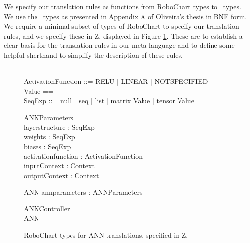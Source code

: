 

We specify our translation rules as functions from RoboChart types to \Circus \ types. We use the \Circus \ types as presented in Appendix A of Oliveira's thesis \cite{Oli06} in BNF form. We require a minimal subset of types of RoboChart to specify our translation rules, and we specify these in Z, displayed in Figure \ref{fig:robochart-ann-types}. These are to establish a clear basis for the translation rules in our meta-language and to define some helpful shorthand to simplify the description of these rules. 

\begin{figure}
    \begin{zed}
	[ Context ] \\
	ActivationFunction ::= RELU | LINEAR | NOTSPECIFIED \\
	Value == \arithmos \\
	SeqExp ::= null\_ seq | list \ldata \seq \nat \rdata | matrix \ldata \seq \seq Value \rdata | tensor \ldata \seq \seq \seq Value \rdata
\end{zed}

\begin{schema}{ANNParameters}
\\
 layerstructure : SeqExp \\
 weights : SeqExp \\
 biases : SeqExp \\
 activationfunction : ActivationFunction \\
 inputContext : Context \\
 outputContext : Context \\
\end{schema}

\begin{schema}{ANN} 
   annparameters : ANNParameters
\end{schema} 

\begin{schema}{ANNController}
\\
ANN
\end{schema}
    \caption{RoboChart types for ANN translations, specified in Z.} 
    \label{fig:robochart-ann-types}
\end{figure}

